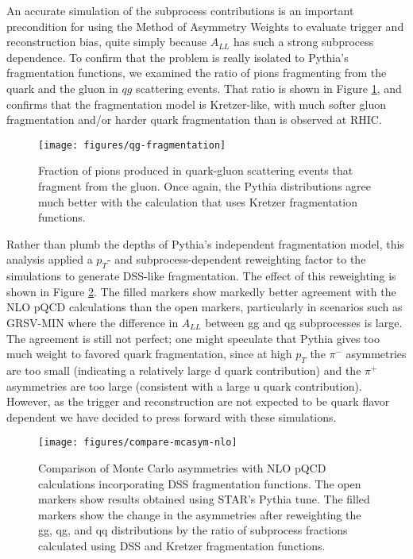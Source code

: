 An accurate simulation of the subprocess contributions is an important
precondition for using the Method of Asymmetry Weights to evaluate trigger and
reconstruction bias, quite simply because $A_{LL}$ has such a strong subprocess
dependence. To confirm that the problem is really isolated to Pythia's
fragmentation functions, we examined the ratio of pions fragmenting from the
quark and the gluon in \(qg\) scattering events. That ratio is shown in Figure
\ref{fig:qg-fragmentation}, and confirms that the fragmentation model is
Kretzer-like, with much softer gluon fragmentation and/or harder quark
fragmentation than is observed at RHIC.

\begin{figure}
  \begin{center}
    \texttt{[image: figures/qg-fragmentation]}
  \end{center}
  \caption{Fraction of pions produced in quark-gluon scattering events that
  fragment from the gluon. Once again, the Pythia distributions agree much
  better with the calculation that uses Kretzer fragmentation functions.}
  \label{fig:qg-fragmentation}
\end{figure}



Rather than plumb the depths of Pythia's independent fragmentation model, this
analysis applied a $p_{T}$- and subprocess-dependent reweighting factor to the
simulations to generate DSS-like fragmentation. The effect of this reweighting
is shown in Figure \ref{fig:compare-mcasym-nlo}. The filled markers show
markedly better agreement with the NLO pQCD calculations than the open markers,
particularly in scenarios such as GRSV-MIN where the difference in $A_{LL}$
between gg and qg subprocesses is large. The agreement is still not perfect; one
might speculate that Pythia gives too much weight to favored quark
fragmentation, since at high $p_{T}$ the $\pi^{-}$ asymmetries are too small
(indicating a relatively large d quark contribution) and the $\pi^{+}$
asymmetries are too large (consistent with a large u quark contribution).
However, as the trigger and reconstruction are not expected to be quark flavor
dependent we have decided to press forward with these simulations.

\begin{figure}
  \texttt{[image: figures/compare-mcasym-nlo]}
  \caption{Comparison of Monte Carlo asymmetries with NLO pQCD calculations
  incorporating DSS fragmentation functions. The open markers show results
  obtained using STAR's Pythia tune. The filled markers show the change in the
  asymmetries after reweighting the gg, qg, and qq distributions by the ratio
  of subprocess fractions calculated using DSS and Kretzer fragmentation
  functions.}
  \label{fig:compare-mcasym-nlo}
\end{figure}


